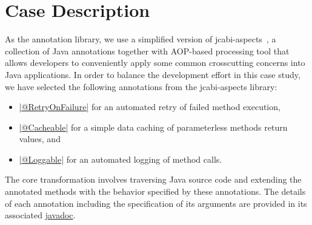 
\section{Case Description}
\label{sec:Description}

As the annotation library, we use a simplified version of jcabi-aspects~\cite{jcabi}, a collection of Java annotations together with AOP-based processing tool that allows developers to conveniently apply some common crosscutting concerns into Java applications.
In order to balance the development effort in this case study, we have selected the following annotations from the jcabi-aspects library:
%
\begin{itemize}[--]
  \item \href{https://github.com/fikovnik/ttc15-tranj-case/blob/master/src/ttc15-tranj/src/main/java/ttc15/tranj/annotation/RetryOnFailure.java}{\javainline|@RetryOnFailure|} for an automated retry of failed method execution,
  \item \href{https://github.com/fikovnik/ttc15-tranj-case/blob/master/src/ttc15-tranj/src/main/java/ttc15/tranj/annotation/Cacheable.java}{\javainline|@Cacheable|} for a simple data caching of parameterless methods return values, and
  \item \href{https://github.com/fikovnik/ttc15-tranj-case/blob/master/src/ttc15-tranj/src/main/java/ttc15/tranj/annotation/Loggable.java}{\javainline|@Loggable|} for an automated logging of method calls.
\end{itemize}

The core transformation involves traversing Java source code and extending the annotated methods with the behavior specified by these annotations.
The details of each annotation including the specification of its arguments are provided in its associated \href{https://github.com/fikovnik/ttc15-tranj-case/tree/master/src/ttc15-tranj/src/main/java/ttc15/tranj/annotation}{javadoc}.

